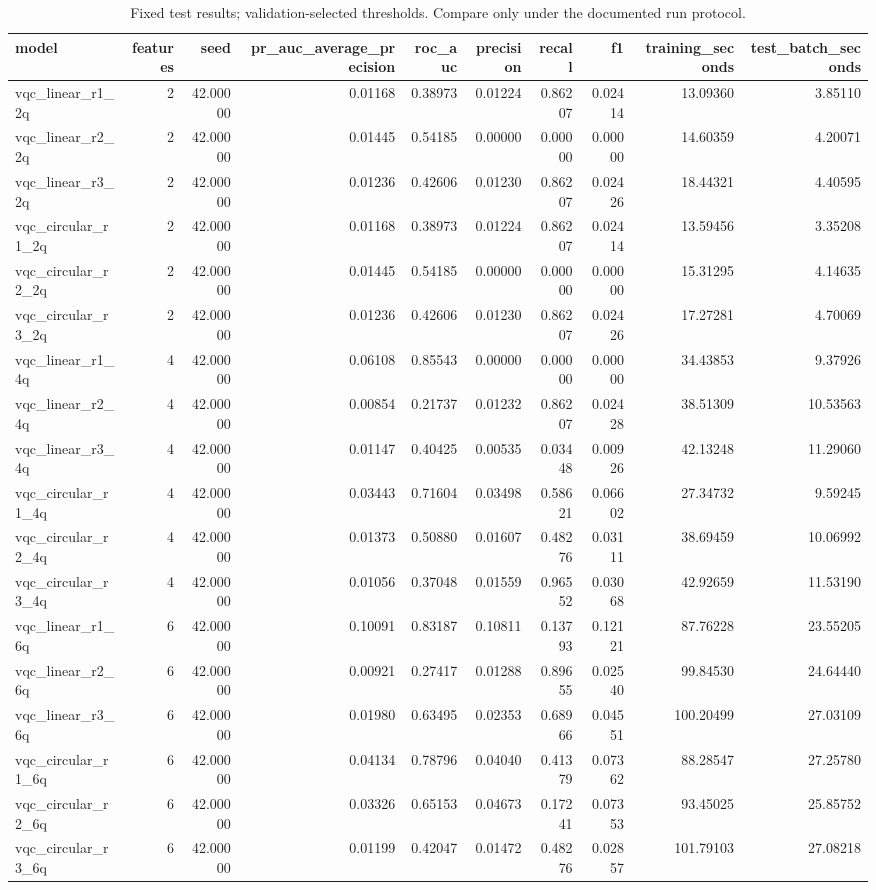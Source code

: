 \begin{table}
\caption{Fixed test results; validation-selected thresholds. Compare only under the documented run protocol.}
\begin{tabular}{lrrrrrrrrr}
\toprule
model & features & seed & pr\_auc\_average\_precision & roc\_auc & precision & recall & f1 & training\_seconds & test\_batch\_seconds \\
\midrule
vqc\_linear\_r1\_2q & 2 & 42.00000 & 0.01168 & 0.38973 & 0.01224 & 0.86207 & 0.02414 & 13.09360 & 3.85110 \\
vqc\_linear\_r2\_2q & 2 & 42.00000 & 0.01445 & 0.54185 & 0.00000 & 0.00000 & 0.00000 & 14.60359 & 4.20071 \\
vqc\_linear\_r3\_2q & 2 & 42.00000 & 0.01236 & 0.42606 & 0.01230 & 0.86207 & 0.02426 & 18.44321 & 4.40595 \\
vqc\_circular\_r1\_2q & 2 & 42.00000 & 0.01168 & 0.38973 & 0.01224 & 0.86207 & 0.02414 & 13.59456 & 3.35208 \\
vqc\_circular\_r2\_2q & 2 & 42.00000 & 0.01445 & 0.54185 & 0.00000 & 0.00000 & 0.00000 & 15.31295 & 4.14635 \\
vqc\_circular\_r3\_2q & 2 & 42.00000 & 0.01236 & 0.42606 & 0.01230 & 0.86207 & 0.02426 & 17.27281 & 4.70069 \\
vqc\_linear\_r1\_4q & 4 & 42.00000 & 0.06108 & 0.85543 & 0.00000 & 0.00000 & 0.00000 & 34.43853 & 9.37926 \\
vqc\_linear\_r2\_4q & 4 & 42.00000 & 0.00854 & 0.21737 & 0.01232 & 0.86207 & 0.02428 & 38.51309 & 10.53563 \\
vqc\_linear\_r3\_4q & 4 & 42.00000 & 0.01147 & 0.40425 & 0.00535 & 0.03448 & 0.00926 & 42.13248 & 11.29060 \\
vqc\_circular\_r1\_4q & 4 & 42.00000 & 0.03443 & 0.71604 & 0.03498 & 0.58621 & 0.06602 & 27.34732 & 9.59245 \\
vqc\_circular\_r2\_4q & 4 & 42.00000 & 0.01373 & 0.50880 & 0.01607 & 0.48276 & 0.03111 & 38.69459 & 10.06992 \\
vqc\_circular\_r3\_4q & 4 & 42.00000 & 0.01056 & 0.37048 & 0.01559 & 0.96552 & 0.03068 & 42.92659 & 11.53190 \\
vqc\_linear\_r1\_6q & 6 & 42.00000 & 0.10091 & 0.83187 & 0.10811 & 0.13793 & 0.12121 & 87.76228 & 23.55205 \\
vqc\_linear\_r2\_6q & 6 & 42.00000 & 0.00921 & 0.27417 & 0.01288 & 0.89655 & 0.02540 & 99.84530 & 24.64440 \\
vqc\_linear\_r3\_6q & 6 & 42.00000 & 0.01980 & 0.63495 & 0.02353 & 0.68966 & 0.04551 & 100.20499 & 27.03109 \\
vqc\_circular\_r1\_6q & 6 & 42.00000 & 0.04134 & 0.78796 & 0.04040 & 0.41379 & 0.07362 & 88.28547 & 27.25780 \\
vqc\_circular\_r2\_6q & 6 & 42.00000 & 0.03326 & 0.65153 & 0.04673 & 0.17241 & 0.07353 & 93.45025 & 25.85752 \\
vqc\_circular\_r3\_6q & 6 & 42.00000 & 0.01199 & 0.42047 & 0.01472 & 0.48276 & 0.02857 & 101.79103 & 27.08218 \\
\bottomrule
\end{tabular}
\end{table}
